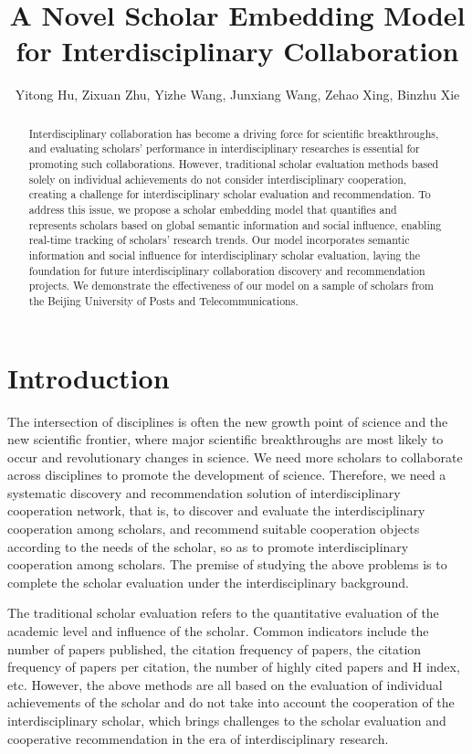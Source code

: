 \documentclass[a4paper]{jpconf}
\begin{document}
\title{A Novel Scholar Embedding Model for Interdisciplinary Collaboration}

\author{Yitong Hu, Zixuan Zhu, Yizhe Wang, Junxiang Wang, Zehao Xing, Binzhu Xie}
\address{Beijing University of Posts and Telecommunications, Beijing, China}

\begin{abstract}
Interdisciplinary collaboration has become a driving force for scientific breakthroughs, and evaluating scholars' performance in interdisciplinary researches is essential for promoting such collaborations. However, traditional scholar evaluation methods based solely on individual achievements do not consider interdisciplinary cooperation, creating a challenge for interdisciplinary scholar evaluation and recommendation. To address this issue, we propose a scholar embedding model that quantifies and represents scholars based on global semantic information and social influence, enabling real-time tracking of scholars' research trends. Our model incorporates semantic information and social influence for interdisciplinary scholar evaluation, laying the foundation for future interdisciplinary collaboration discovery and recommendation projects. We demonstrate the effectiveness of our model on a sample of scholars from the Beijing University of Posts and Telecommunications.
\end{abstract}




\section{Introduction}
The intersection of disciplines is often the new growth point of science
and the new scientific frontier, where major scientific breakthroughs
are most likely to occur and revolutionary changes in science. We need
more scholars to collaborate across disciplines to promote the development
of science. Therefore, we need a systematic discovery and recommendation
solution of interdisciplinary cooperation network, that is, to discover
and evaluate the interdisciplinary cooperation among scholars, and
recommend suitable cooperation objects according to the needs of the scholar,
so as to promote interdisciplinary cooperation among scholars. 
The premise of studying the above problems is to complete the scholar
evaluation under the interdisciplinary background.

The traditional scholar evaluation refers to the quantitative evaluation
of the academic level and influence of the scholar. Common indicators include
the number of papers published, the citation frequency of papers, the
citation frequency of papers per citation, the number of highly cited
papers and H index, etc. However, the above methods are all based on the
evaluation of individual achievements of the scholar and do not take into
account the cooperation of the interdisciplinary scholar, which brings
challenges to the scholar evaluation and cooperative recommendation in
the era of interdisciplinary research.
\end{document}
